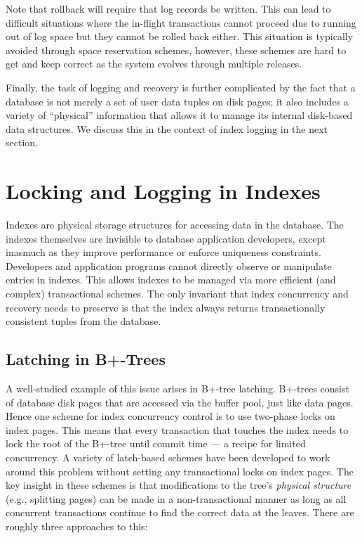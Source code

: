 \documentclass[a4paper,11pt,twoside,openright]{book}
\begin{document}
Note that rollback will require that log records be written. This can
lead to difficult situations where the in-flight transactions cannot
proceed due to running out of log space but they cannot be rolled back
either. This situation is typically avoided through space reservation
schemes, however, these schemes are hard to get and keep correct as the
system evolves through multiple releases.

Finally, the task of logging and recovery is further complicated by the
fact that a database is not merely a set of user data tuples on disk
pages; it also includes a variety of ``physical'' information that
allows it to manage its internal disk-based data structures. We discuss
this in the context of index logging in the next section.

\hypertarget{locking-and-logging-in-indexes}{%
\section{Locking and Logging in
Indexes}\label{locking-and-logging-in-indexes}}

Indexes are physical storage structures for accessing data in the
database. The indexes themselves are invisible to database application
developers, except inasmuch as they improve performance or enforce
uniqueness constraints. Developers and application programs cannot
directly observe or manipulate entries in indexes. This allows indexes
to be managed via more efficient (and complex) transactional schemes.
The only invariant that index concurrency and recovery needs to preserve
is that the index always returns transactionally consistent tuples from
the database.

\hypertarget{latching-in-b-trees}{%
\subsection{Latching in B+-Trees}\label{latching-in-b-trees}}

A well-studied example of this issue arises in B+-tree latching.
B+-trees consist of database disk pages that are accessed via the buffer
pool, just like data pages. Hence one scheme for index concurrency
control is to use two-phase locks on index pages. This means that every
transaction that touches the index needs to lock the root of the B+-tree
until commit time --- a recipe for limited concurrency. A variety of
latch-based schemes have been developed to work around this problem
without setting any transactional locks on index pages. The key insight
in these schemes is that modifications to the tree's \emph{physical
structure} (e.g., splitting pages) can be made in a non-transactional
manner as long as all concurrent transactions continue to find the
correct data at the leaves. There are roughly three approaches to this:
\end{document}
